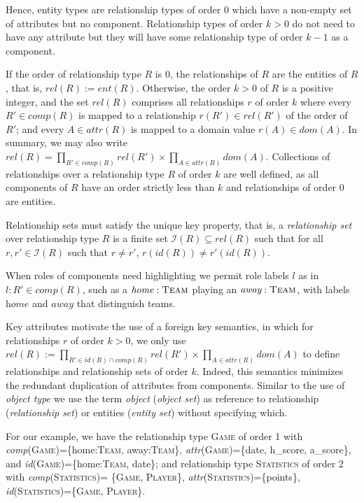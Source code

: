 \documentclass[sigconf]{acmart}
\begin{document}
Hence, entity types are relationship types of order $0$ which have a non-empty set of attributes but no component. Relationship types of order $k>0$ do not need to have any attribute but they will have some relationship type of order $k-1$ as a component.

If the order of relationship type $R$ is $0$, the relationships of $R$ are the entities of $R$, that is, $\textit{rel}(R):=\textit{ent}(R)$. Otherwise, the order $k>0$ of $R$ is a positive integer, and the set $\textit{rel}(R)$ comprises all relationships $r$ of order $k$ where every $R'\in\textit{comp}(R)$ is mapped to a relationship $r(R')\in\textit{rel}(R')$ of the order of $R'$; and every $A\in\textit{attr}(R)$ is mapped to a domain value $r(A)\in\textit{dom}(A)$. In summary, we may also write $\textit{rel}(R)=\prod_{R'\in\textit{comp}(R)}\textit{rel}(R')\times\prod_{A\in\textit{attr}(R)}\textit{dom}(A)$. Collections of relationships over a relationship type $R$ of order $k$ are well defined, as all components of $R$ have an order strictly less than $k$ and relationships of order $0$ are entities.

Relationship sets must satisfy the unique key property, that is, a \textit{relationship set} over relationship type $R$ is a finite set $\mathcal{I}(R)\subseteq\textit{rel}(R)$ such that for all $r,r'\in\mathcal{I}(R)$ such that $r\neq r'$, $r(\textit{id}(R))\not=r'(\textit{id}(R))$.

When roles of components need highlighting we permit role labels $l$ as in $l:R'\in\textit{comp}(R)$, such as a $\textit{home}:\textsc{Team}$ playing an $\textit{away}:\textsc{Team}$, with labels $\textit{home}$ and $\textit{away}$ that distinguish teams.

Key attributes motivate the use of a foreign key semantics, in which for relationships $r$ of order $k>0$, we only use $\textit{rel}(R):=\prod_{R'\in\textit{id}(R)\cap\textit{comp}(R)}\textit{rel}(R')\times\prod_{A\in\textit{attr}(R)}\textit{dom}(A)$ to define relationships and relationship sets of order $k$. Indeed, this semantics minimizes the redundant duplication of attributes from components. Similar to the use of \emph{object type} we use the term \emph{object} (\emph{object set}) as reference to relationship (\emph{relationship set}) or entities (\emph{entity set}) without specifying which.

For our example, we have the relationship type \textsc{Game} of order 1 with \textit{comp}(\textsc{Game})=\{home:\textsc{Team}, away:\textsc{Team}\}, \textit{attr}(\textsc{Game})=\{date, h\_score, a\_score\}, and \textit{id}(\textsc{Game})=\{home:\textsc{Team}, date\}; and relationship type \textsc{Statistics} of order 2 with \textit{comp}(\textsc{Statistics})=
\{\textsc{Game}, \textsc{Player}\}, \textit{attr}(\textsc{Statistics})=\{points\}, \textit{id}(\textsc{Statistics})=\{\textsc{Game}, \textsc{Player}\}.
\end{document}
